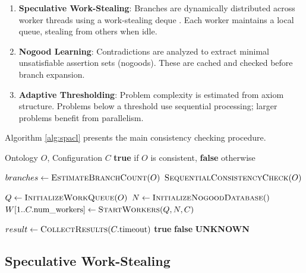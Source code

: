 \documentclass[preprint,12pt]{elsarticle}
\begin{document}
\begin{enumerate}
    \item \textbf{Speculative Work-Stealing}: Branches are dynamically distributed across worker threads using a work-stealing deque \cite{workstealing}. Each worker maintains a local queue, stealing from others when idle.
    
    \item \textbf{Nogood Learning}: Contradictions are analyzed to extract minimal unsatisfiable assertion sets (nogoods). These are cached and checked before branch expansion.
    
    \item \textbf{Adaptive Thresholding}: Problem complexity is estimated from axiom structure. Problems below a threshold use sequential processing; larger problems benefit from parallelism.
\end{enumerate}

Algorithm \ref{alg:spacl} presents the main consistency checking procedure.

\begin{algorithm}[htbp]
\caption{SPACL Consistency Check}
\label{alg:spacl}
\begin{algorithmic}[1]
\Require Ontology $O$, Configuration $C$
\Ensure \textbf{true} if $O$ is consistent, \textbf{false} otherwise

\State $branches \gets \textsc{EstimateBranchCount}(O)$
 \label{line:threshold}
    \State \Return $\textsc{SequentialConsistencyCheck}(O)$ \label{line:sequential}
\EndIf

\State $Q \gets \textsc{InitializeWorkQueue}(O)$ \label{line:init}
\State $N \gets \textsc{InitializeNogoodDatabase}()$
\State $W[1..C.\text{num\_workers}] \gets \textsc{StartWorkers}(Q, N, C)$

    \State $result \gets \textsc{CollectResults}(C.\text{timeout})$
     \Return \textbf{true}
     \Return \textbf{false}
     \Return \textbf{UNKNOWN}
    \EndIf
\EndWhile
\end{algorithmic}
\end{algorithm}

\subsection{Speculative Work-Stealing}
\label{sec:workstealing}
\end{document}
